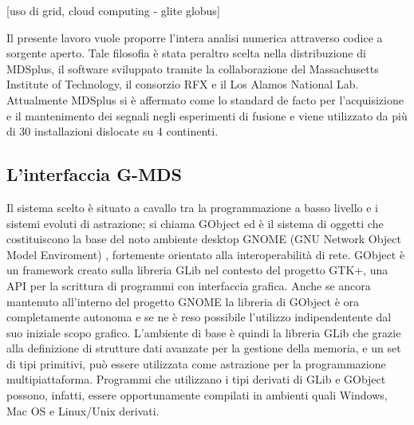 [uso di grid, cloud computing - glite globus]

Il presente lavoro vuole proporre l'intera analisi numerica
attraverso codice a sorgente aperto.  Tale filosofia è stata peraltro
scelta nella distribuzione di MDSplus, il software sviluppato tramite la
collaborazione del Massachusetts Institute of Technology, il consorzio
RFX e il Los Alamos National Lab. Attualmente MDSplus si è affermato
come lo standard de facto per l'acquisizione e il mantenimento dei
segnali negli esperimenti di fusione e viene utilizzato da più di 30
installazioni dislocate su 4 continenti.


\subsection{L'interfaccia G-MDS}

Il sistema scelto è situato a cavallo tra la programmazione a basso
livello e i sistemi evoluti di astrazione; si chiama GObject ed è il
sistema di oggetti che costituiscono la base del noto ambiente desktop
GNOME (GNU Network Object Model Enviroment) \cite{url_gnome}, fortemente
orientato alla interoperabilità di rete. GObject è un framework creato
sulla libreria GLib nel contesto del progetto GTK+, una API per la
scrittura di programmi con interfaccia grafica. Anche se ancora
mantenuto all'interno del progetto GNOME la libreria di GObject è ora
completamente autonoma e se ne è reso possibile l'utilizzo
indipendentente dal suo iniziale scopo grafico. L'ambiente di base è
quindi la libreria GLib che grazie alla definizione di strutture dati
avanzate per la gestione della memoria, e un set di tipi primitivi, può
essere utilizzata come astrazione per la programmazione
multipiattaforma. Programmi che utilizzano i tipi derivati di GLib e
GObject possono, infatti, essere opportunamente compilati in ambienti
quali Windows, Mac OS e Linux/Unix derivati.


